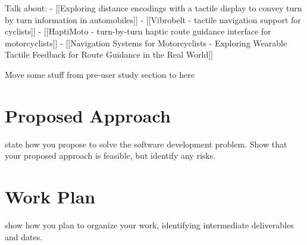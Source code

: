 \documentclass{interim}
\begin{document}
Talk about:
- [[Exploring distance encodings with a tactile display to convey turn by turn information in automobiles]]
- [[Vibrobelt - tactile navigation support for cyclists]]
- [[HaptiMoto - turn-by-turn haptic route guidance interface for motorcyclists]]
- [[Navigation Systems for Motorcyclists - Exploring Wearable Tactile Feedback for Route Guidance in the Real World]]


Move some stuff from pre-user study section to here



\section{Proposed Approach}

state how you propose to solve the software development problem. Show that your proposed approach is feasible, but identify any risks.

\section{Work Plan}

show how you plan to organize your work, identifying intermediate deliverables and dates.



\end{document}
